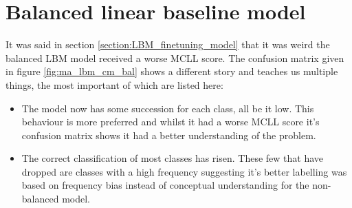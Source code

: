 
\section{Balanced linear baseline model}
\label{section:ma_lbm_balanced}

It was said in section \ref{section:LBM_finetuning_model} that it was weird the balanced LBM model received a worse MCLL score.
The confusion matrix given in figure \ref{fig:ma_lbm_cm_bal} shows a different story and teaches us multiple things, the most important of which are listed here:
\begin{itemize}
    \item The model now has some succession for each class, all be it low. This behaviour is more preferred and whilst it had a worse MCLL score it's confusion matrix shows it had a better understanding of the problem.
    \item The correct classification of most classes has risen. These few that have dropped are classes with a high frequency suggesting it's better labelling was based on frequency bias instead of conceptual understanding for the non-balanced model. 
\end{itemize}

